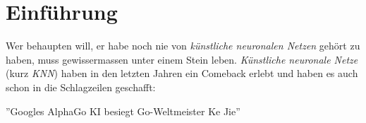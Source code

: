 \section{Einführung}

Wer behaupten will, er habe noch nie von \textit{künstliche neuronalen Netzen} gehört zu haben, muss gewissermassen unter einem Stein leben. \textit{Künstliche neuronale Netze} (kurz \textit{KNN}) haben in den letzten Jahren ein Comeback erlebt und haben es auch schon in die Schlagzeilen geschafft:

\begin{center}
	{\Huge ''Googles AlphaGo KI besiegt Go-Weltmeister Ke Jie''}\cite{theverge}
\end{center}